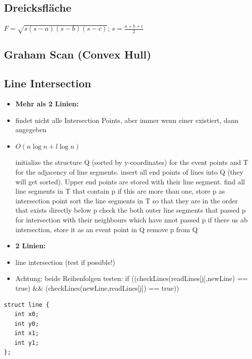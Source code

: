\documentclass[10pt,a4paper,ngerman,oneside,]{article}
\begin{document}
\begin{multicols}{2}
\subsection{Dreicksfläche}
$F=\sqrt{s(s-a)(s-b)(s-c)};\,s=\frac{a+b+c}{2}$

\subsection{Graham Scan (Convex Hull)}
\subsection{Line Intersection}
	\begin{itemize}
		\item \textbf{Mehr als 2 Linien:}
		\item findet nicht alle Intersection Points, aber immer wenn einer existiert, dann angegeben
		\item $O(n\log n + l \log n)$
		\begin{algorithm}
			\begin{algorithmic}[1]
			\STATE initialize the structure Q (sorted by y-coordinates) for the event points and T for the adjacency of line segments.
			\STATE insert all end points of lines into Q (they will get sorted). Upper end points are stored with their line segment.
				\STATE find all line segments in T that contain p
				\STATE if this are more than one, store p as intersection point
				\STATE sort the line segments in T so that they are in the order that exists directly below p
				\STATE check the both outer line segments that passed p for intersection with their neighbours which have nnot passed p
				\STATE if there us ab intersection, store it as an event point in Q
				\STATE remove p from Q
			\ENDWHILE
			\end{algorithmic}
		\end{algorithm}
		\item \textbf{2 Linien:}
		\item line intersection (test if possible!)
		\item Achtung: beide Reihenfolgen testen:
		    if ((checkLines(readLines[j],newLine) == true) $\&\&$ (checkLines(newLine,readLines[j]) == true))
	\end{itemize}
		\lstset{language=c}
			\begin{lstlisting}
struct line {
   int x0;
   int y0;
   int x1;
   int y1;
};


\end{lstlisting}
\end{multicols}
\end{document}
